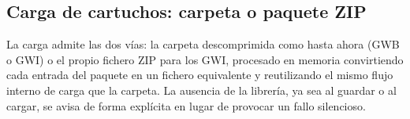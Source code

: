 \subsection{Carga de cartuchos: carpeta o paquete ZIP}
\label{subsec:cargarZIP}

La carga admite las dos vías: la carpeta descomprimida como hasta ahora (GWB o GWI) o el propio fichero ZIP para los GWI, procesado en memoria convirtiendo cada entrada del paquete en un fichero equivalente y reutilizando el mismo flujo interno de carga que la carpeta. La ausencia de la librería, ya sea al guardar o al cargar, se avisa de forma explícita en lugar de provocar un fallo silencioso.

\clearpage